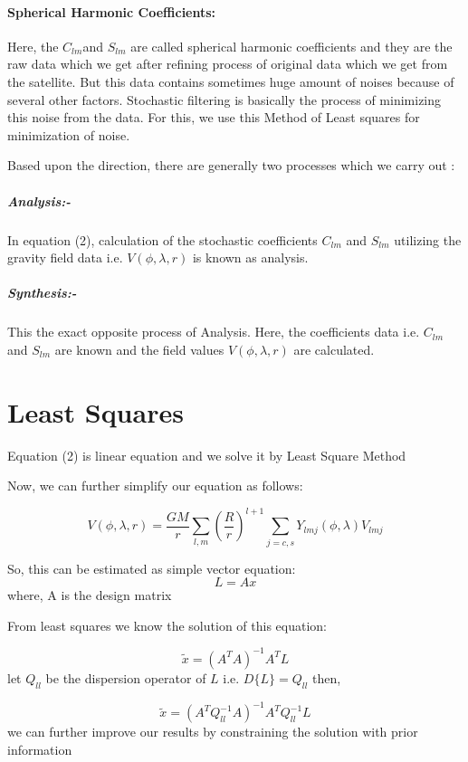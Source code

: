 \documentclass[a4paper,12pt]{article}
\begin{document}
\paragraph{Spherical Harmonic Coefficients:} 
Here, the $C_{lm}$and $S_{lm}$ are called spherical harmonic coefficients and they are the raw data which we get after refining process of original data which we get from the satellite. But this data contains sometimes huge amount of noises because of several other factors. Stochastic filtering is basically the process of minimizing this noise from the data. For this, we use this Method of Least squares for minimization of noise.

Based upon the direction, there are generally two processes which we carry out :

\subparagraph{Analysis:- }  In equation (2), calculation of the stochastic coefficients $C_{lm} $ and $S_{lm}$ utilizing the gravity field data i.e. $V(\phi,\lambda,r)$ is known as analysis.
 \subparagraph{Synthesis:- } This the exact opposite process of Analysis. Here, the coefficients data i.e. $C_{lm} $ and $S_{lm}$ are known and the field values $V(\phi,\lambda,r)$ are calculated.
\section{Least Squares}
Equation (2) is linear equation and we solve it by Least Square Method

Now, we can further simplify our equation as follows:

\begin{equation}
V(\phi,\lambda,r)=\frac{GM}{r}\sum_{l,m}^{} \left(\frac{R}{r}\right)^{l+1}\sum_{j=c,s}^{}  Y_{lmj} (\phi,\lambda) V_{lmj}
\end{equation}

So, this can be estimated as simple vector equation:
\begin{equation}
  L= Ax  
\end{equation}
where, A is the design matrix

From least squares we know the solution of this equation:

\begin{equation}
\tilde{x} =(A^T A)^{-1} A^T L
\end{equation}
let $ Q_{ll}$ be the dispersion operator of $L$ i.e. $D\{L\}=Q_{ll}$
then,

\begin{equation}
\tilde{x} =(A^T Q_{ll}^{-1} A)^{-1} A^T Q_{ll}^{-1} L
\end{equation}
 we can further improve our results by constraining the solution with prior information
 
\end{document}
